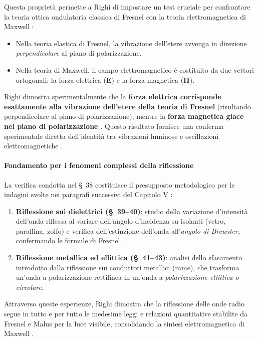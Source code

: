 Questa proprietà permette a Righi di impostare un test cruciale per confrontare la teoria ottica ondulatoria classica di Fresnel con la teoria elettromagnetica di Maxwell \cite{righi1897ottica}:
\begin{itemize}
    \item Nella teoria elastica di Fresnel, la vibrazione dell'etere avvenga in direzione \emph{perpendicolare} al piano di polarizzazione.
    \item Nella teoria di Maxwell, il campo elettromagnetico è costituito da due vettori ortogonali: la forza elettrica ($\mathbf{E}$) e la forza magnetica ($\mathbf{H}$).
\end{itemize}
Righi dimostra sperimentalmente che la \textbf{forza elettrica corrisponde esattamente alla vibrazione dell'etere della teoria di Fresnel} (risultando perpendicolare al piano di polarizzazione), mentre la \textbf{forza magnetica giace nel piano di polarizzazione} \cite{righi1897ottica}. Questo risultato fornisce una conferma sperimentale diretta dell'identità tra vibrazioni luminose e oscillazioni elettromagnetiche \cite{righi1897ottica, righi1897ottica}.

\paragraph{Fondamento per i fenomeni complessi della riflessione}
La verifica condotta nel \S~38 costituisce il presupposto metodologico per le indagini svolte nei paragrafi successivi del Capitolo V \cite{righi1897ottica}:
\begin{enumerate}
    \item \textbf{Riflessione sui dielettrici (\S~39--40)}: studio della variazione d'intensità dell'onda riflessa al variare dell'angolo d'incidenza su isolanti (vetro, paraffina, zolfo) e verifica dell'estinzione dell'onda all'\emph{angolo di Brewster}, confermando le formule di Fresnel.
    \item \textbf{Riflessione metallica ed ellittica (\S~41--43)}: analisi dello sfasamento introdotto dalla riflessione sui conduttori metallici (rame), che trasforma un'onda a polarizzazione rettilinea in un'onda a \emph{polarizzazione ellittica o circolare}.
\end{enumerate}

Attraverso queste esperienze, Righi dimostra che la riflessione delle onde radio segue in tutto e per tutto le medesime leggi e relazioni quantitative stabilite da Fresnel e Malus per la luce visibile, consolidando la sintesi elettromagnetica di Maxwell \cite{righi1897ottica}.

